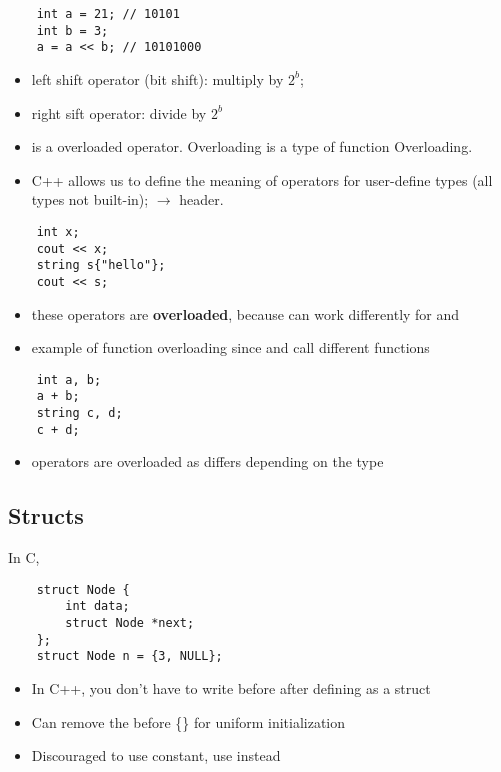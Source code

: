 \begin{lstlisting}
    int a = 21; // 10101
    int b = 3;
    a = a << b; // 10101000
\end{lstlisting}
\begin{itemize}
    \item left shift operator (bit shift): multiply by $ 2^b $;
    \item right sift operator: divide by $ 2^b $
    \item \code{<{}<} is a overloaded operator. Overloading is a type of function
    Overloading.
    \item C++ allows us to define the meaning of operators for user-define types
    (all types not built-in);  $ \rightarrow $ 
    header.
\end{itemize}
\begin{lstlisting}
    int x;
    cout << x;
    string s{"hello"};
    cout << s;
\end{lstlisting}
\begin{itemize}
    \item these operators are \textbf{overloaded}, because \code{<{}<} can work
    differently for  and 
    \item example of function overloading since 
    and  call different functions 
\end{itemize}
\begin{lstlisting}
    int a, b;
    a + b;
    string c, d;
    c + d;
\end{lstlisting}
\begin{itemize}
    \item operators are overloaded as \code{+} differs depending on the type
\end{itemize}

\subsection{Structs}
In C,
\begin{lstlisting}
    struct Node {
        int data;
        struct Node *next;
    };
    struct Node n = {3, NULL};
\end{lstlisting}
\begin{itemize}
    \item In C++, you don't have to write  before  after defining
     as a struct
    \item Can remove the \code{=} before \{\} for uniform initialization
    \item Discouraged to use  constant, use  instead
\end{itemize}

